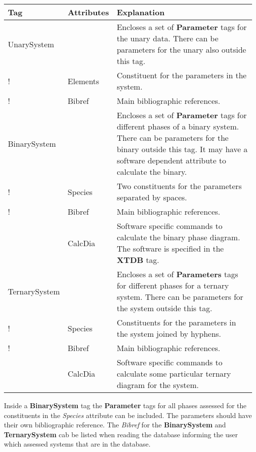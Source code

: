 \documentclass{article}
\begin{document}
\bigskip
\begin{tabular}{|p{} p{} p{}|}\hline
  Tag & Attributes &  Explanation\\\hline

  UnarySystem  && Encloses a set of {\bf Parameter} tags for the unary data.
          There can be parameters for the unary also outside this tag.\\
!          & Elements & Constituent for the parameters in the system.\\
!          & Bibref & Main bibliographic references.\\\hline

  BinarySystem  && Encloses a set of {\bf Parameter} tags for different
          phases of a binary system.
          There can be parameters for the binary outside this tag.  It may
          have a software dependent attribute to calculate the binary.\\
!          & Species & Two constituents for the parameters 
                       separated by spaces.  \\
!          & Bibref & Main bibliographic references.\\
          & CalcDia & Software specific commands to calculate the binary
                       phase diagram.  The software is specified in the
                       {\bf XTDB} tag.\\\hline

  TernarySystem  && Encloses a set of {\bf Parameters} tags for different
           phases for a ternary system.
          There can be parameters for the system outside this tag.\\
!          & Species & Constituents for the parameters in the system joined
                       by hyphens.\\
!          & Bibref & Main bibliographic references.\\
          & CalcDia & Software specific commands to calculate some particular
                     ternary diagram for the system.\\\hline
\end{tabular}

\bigskip
Inside a {\bf BinarySystem} tag the {\bf Parameter} tags for all
phases assessed for the constituents in the {\em Species} attribute
can be included.  The parameters should have their own bibliographic
reference.  The {\em Bibref} for the {\bf BinarySystem} and {\bf
  TernarySystem} cab be listed when reading the database informing the
user which assessed systems that are in the database.
\end{document}
